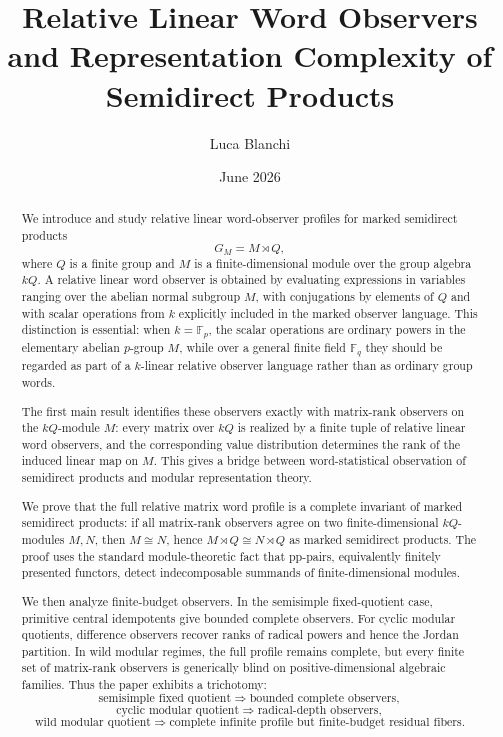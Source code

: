 \documentclass[11pt]{article}
\title{Relative Linear Word Observers and Representation Complexity of Semidirect Products}
\author{Luca Blanchi}
\date{June 2026}
\begin{document}
\maketitle

\begin{abstract}
We introduce and study relative linear word-observer profiles for marked semidirect products
\[
G_M=M\rtimes Q,
\]
where $Q$ is a finite group and $M$ is a finite-dimensional module over the group algebra $kQ$. A relative linear word observer is obtained by evaluating expressions in variables ranging over the abelian normal subgroup $M$, with conjugations by elements of $Q$ and with scalar operations from $k$ explicitly included in the marked observer language. This distinction is essential: when $k=\mathbb F_p$, the scalar operations are ordinary powers in the elementary abelian $p$-group $M$, while over a general finite field $\mathbb F_q$ they should be regarded as part of a $k$-linear relative observer language rather than as ordinary group words.

The first main result identifies these observers exactly with matrix-rank observers on the $kQ$-module $M$: every matrix over $kQ$ is realized by a finite tuple of relative linear word observers, and the corresponding value distribution determines the rank of the induced linear map on $M$. This gives a bridge between word-statistical observation of semidirect products and modular representation theory.

We prove that the full relative matrix word profile is a complete invariant of marked semidirect products: if all matrix-rank observers agree on two finite-dimensional $kQ$-modules $M,N$, then $M\cong N$, hence $M\rtimes Q\cong N\rtimes Q$ as marked semidirect products. The proof uses the standard module-theoretic fact that pp-pairs, equivalently finitely presented functors, detect indecomposable summands of finite-dimensional modules.

We then analyze finite-budget observers. In the semisimple fixed-quotient case, primitive central idempotents give bounded complete observers. For cyclic modular quotients, difference observers recover ranks of radical powers and hence the Jordan partition. In wild modular regimes, the full profile remains complete, but every finite set of matrix-rank observers is generically blind on positive-dimensional algebraic families. Thus the paper exhibits a trichotomy:
\[
\text{semisimple fixed quotient}\Rightarrow\text{bounded complete observers},
\]
\[
\text{cyclic modular quotient}\Rightarrow\text{radical-depth observers},
\]
\[
\text{wild modular quotient}\Rightarrow\text{complete infinite profile but finite-budget residual fibers}.
\]
\end{abstract}
\end{document}
